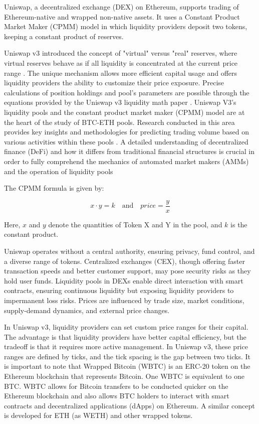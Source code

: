 \documentclass{article}
\begin{document}
Uniswap, a decentralized exchange (DEX) on Ethereum, supports trading of Ethereum-native and wrapped non-native assets. It uses a Constant Product Market Maker (CPMM) model in which liquidity providers deposit two tokens, keeping a constant product of reserves\cite{Miori2023, Heimbach2022,Miori2023}.

Uniswap v3 introduced the concept of "virtual" versus "real" reserves, where virtual reserves behave as if all liquidity is concentrated at the current price range \cite{Elsts2021}. The unique mechanism allows more efficient capital usage and offers liquidity providers the ability to customize their price exposure. Precise calculations of position holdings and pool's parameters are possible through the equations provided by the Uniswap v3 liquidity math paper \cite{Elsts2021,Miori2023}. Uniswap V3's liquidity pools and the constant product market maker (CPMM) model are at the heart of the study of BTC-ETH pools. Research conducted in this area provides key insights and methodologies for predicting trading volume based on various activities within these pools \cite{Miori2023}. A detailed understanding of decentralized finance (DeFi) and how it differs from traditional financial structures is crucial in order to fully comprehend the mechanics of automated market makers (AMMs) and the operation of liquidity pools \cite{Makarov2022}

The CPMM formula is given by:

\[x \cdot y = k \quad \text{and} \quad price = \frac{y}{x}\]

Here, \(x\) and \(y\) denote the quantities of Token X and Y in the pool, and \(k\) is the constant product\cite{Makarov2022,Miori2023}.

Uniswap operates without a central authority, ensuring privacy, fund control, and a diverse range of tokens\cite{Miori2023}. Centralized exchanges (CEX), though offering faster transaction speeds and better customer support, may pose security risks as they hold user funds\cite{Makarov2022}. Liquidity pools in DEXs enable direct interaction with smart contracts, ensuring continuous liquidity but exposing liquidity providers to impermanent loss risks\cite{Aigner2021, Heimbach2022}. Prices are influenced by trade size, market conditions, supply-demand dynamics, and external price changes\cite{Miori2022,Heimbach2022,Miori2023}.

In Uniswap v3, liquidity providers can set custom price ranges for their capital. The advantage is that liquidity providers have better capital efficiency, but the tradeoff is that it requires more active management. In Uniswap v3, these price ranges are defined by ticks, and the tick spacing is the gap between two ticks. It is important to note that Wrapped Bitcoin (WBTC) is an ERC-20 token on the Ethereum blockchain that represents Bitcoin. One WBTC is equivalent to one BTC. WBTC allows for Bitcoin transfers to be conducted quicker on the Ethereum blockchain and also allows BTC holders to interact with smart contracts and decentralized applications (dApps) on Ethereum. A  similar concept is developed for ETH (as WETH) and other wrapped tokens.
\end{document}
